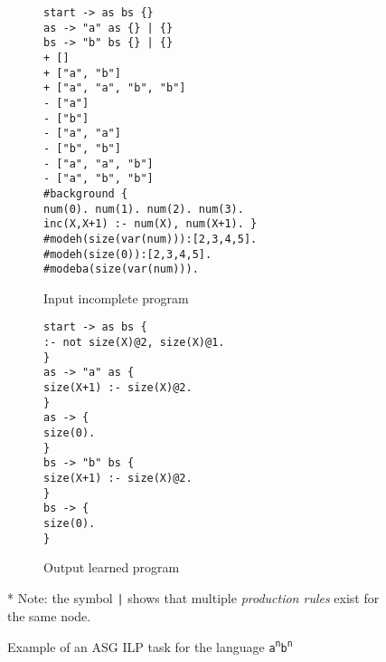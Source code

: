 \begin{figure}[H]
\centering
\begin{subfigure}{0.55\textwidth}
\texttt{start -> as bs \{\} \\
as -> "a" as \{\} | \{\} \\
bs -> "b" bs \{\} | \{\} \\
\newline
+ [] \\
+ ["a", "b"] \\
+ ["a", "a", "b", "b"] \\
- ["a"] \\
- ["b"] \\
- ["a", "a"] \\
- ["b", "b"] \\
- ["a", "a", "b"] \\
- ["a", "b", "b"] \\
\newline
\#background \{ \\
num(0). num(1). num(2). num(3). \\
inc(X,X+1) :- num(X), num(X+1). \} \\
\newline
\#modeh(size(var(num))):[2,3,4,5]. \\
\#modeh(size(0)):[2,3,4,5]. \\
\#modeba(size(var(num))). \\}
\caption{Input incomplete program}
\end{subfigure}
\begin{subfigure}{0.44\textwidth}
\texttt{start -> as bs \{ \\
\phantom{ }:- not size(X)@2, size(X)@1. \\
\} \\
\newline
as -> "a" as \{ \\
\phantom{ }size(X+1) :- size(X)@2. \\
\} \\
\newline
as -> \{ \\
\phantom{ }size(0). \\
\} \\
\newline
bs -> "b" bs \{ \\
\phantom{ }size(X+1) :- size(X)@2. \\
\} \\
\newline
bs -> \{ \\
\phantom{ }size(0). \\
\}} \\
\caption{Output learned program}
\end{subfigure}
\newline
\newline
* Note: the symbol \texttt{|} shows that multiple \textit{production rules} exist for the same node.
\caption{Example of an ASG ILP task for the language \texttt{a\textsuperscript{n}b\textsuperscript{n}}}
\label{fig:asg_ilp_example}
\end{figure}

